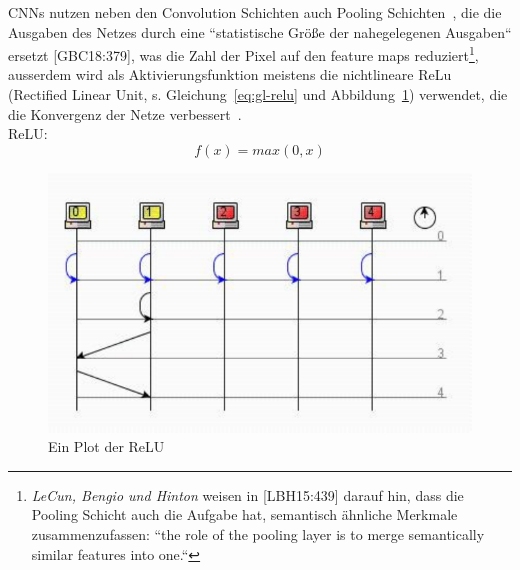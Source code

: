 CNNs nutzen neben den Convolution Schichten auch Pooling Schichten~\cite[325]{Ert21b}, die die Ausgaben des Netzes durch eine ``statistische Größe der nahegelegenen Ausgaben`` ersetzt [GBC18:379], was die Zahl der Pixel auf den feature maps reduziert\footnote{ \textit{LeCun, Bengio und Hinton} weisen in [LBH15:439] darauf hin, dass die Pooling Schicht auch die Aufgabe hat, semantisch ähnliche Merkmale zusammenzufassen: ``the role of the pooling layer is to merge semantically similar features into one.``
}, ausserdem wird als Aktivierungsfunktion meistens die nichtlineare ReLu (Rectified Linear Unit, s. Gleichung~\ref{eq:gl-relu} und Abbildung~\ref{fig-relu}) verwendet, die die Konvergenz der Netze verbessert~\cite[327]{Ert21b}.\\

ReLU:
\begin{equation} f(x) = max(0, x)
    \label{eq:gl-relu}
\end{equation}


\begin{figure}[h]
    \centering
    \includegraphics{images/p1ReadSeq.pdf}
    \caption{Ein Plot der ReLU}
    \label{fig-relu}
\end{figure}




